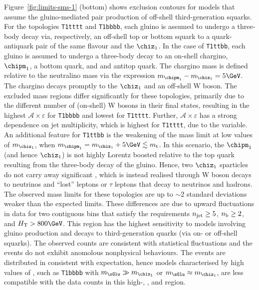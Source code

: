 Figure~\ref{fig:limits-sms-1} (bottom) shows exclusion contours for
models that assume the gluino-mediated pair production of off-shell
third-generation squarks. For the topologies \texttt{T1tttt} and
\texttt{T1bbbb}, each gluino is assumed to undergo a three-body decay
via, respectively, an off-shell top or bottom squark to a
quark-antiquark pair of the same flavour and the $\chiz_1$. In the
case of \texttt{T1ttbb}, each gluino is assumed to undergo a
three-body decay to an on-shell chargino, $\chipm_1$, a bottom quark,
and and antitop quark. The chargino mass is defined relative to the
neutralino mass via the expression $m_{\chipm_1} - m_{\chiz_1} =
5\GeV$. The chargino decays promptly to the $\chiz_1$ and an off-shell
W boson. The excluded mass regions differ significantly for these
topologies, primarily due to the different number of (on-shell) W
bosons in their final states, resulting in the highest $\mathcal{A}
\times \varepsilon$ for \texttt{T1bbbb} and lowest for
\texttt{T1tttt}. Further, $\mathcal{A} \times \varepsilon$ has a
strong dependence on jet multiplicity, which is highest for
\texttt{T1tttt}, due to the \bdphi variable. An additional feature for
\texttt{T1ttbb} is the weakening of the mass limit at low values of
$m_{\chiz_1}$, when $m_{\chipm_1} = m_{\chiz_1} + 5\GeV \lesssim
m_\text{t}$. In this scenario, the $\chipm_1$ (and hence $\chiz_1$) is
not highly Lorentz boosted relative to the top quark resulting from
the three-body decay of the gluino. Hence, two $\chiz_1$ sparticles do
not carry away significant \ETmiss, which is instead realised through
W boson decays to neutrinos and ``lost'' leptons or $\tau$ leptons
that decay to neutrinos and hadrons. The observed mass limits for
these topologies are up to $\sim$2 standard deviations weaker than the
expected limits. These differences are due to upward fluctuations in
data for two contiguous bins that satisfy the requirements $n_{\text{jet}} \geq
5$, $n_{\text{b}} \geq 2$, and $\scalht > 800\GeV$. This region has the highest
sensitivity to models involving gluino production and decays to
third-generation quarks (via on- or off-shell squarks). The observed
counts are consistent with statistical fluctuations and the events do
not exhibit anomolous nonphysical behaviours. The events are
distributed in \HTmiss consistent with expectation, hence models
characterised by high values of \HTmiss, such as \texttt{T1bbbb} with
$m_{\sGlu} \gg m_{\chiz_1}$ or $m_{\sGlu} \approx m_{\chiz_1}$, are
less compatible with the data counts in this high-\njet, \nb, and
\scalht region.


